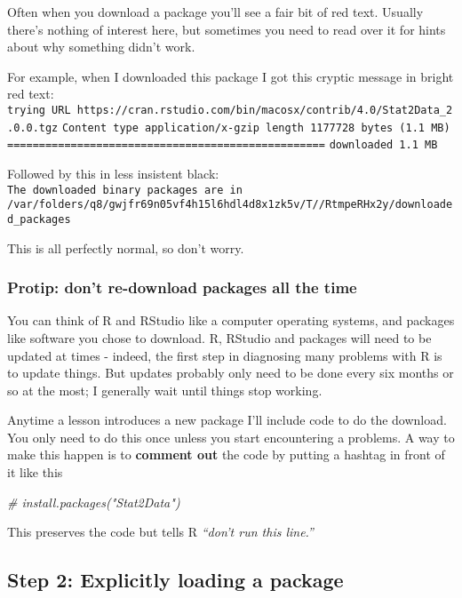 \documentclass[
]{book}
\newenvironment{Shaded}{\begin{snugshade}}{\end{snugshade}}
\newcommand{\CommentTok}[1]{\textcolor[rgb]{0.56,0.35,0.01}{\textit{#1}}}
\begin{document}
Often when you download a package you'll see a fair bit of red text. Usually there's nothing of interest here, but sometimes you need to read over it for hints about why something didn't work.

For example, when I downloaded this package I got this cryptic message in bright red text:
\texttt{trying\ URL\ \textquotesingle{}https://cran.rstudio.com/bin/macosx/contrib/4.0/Stat2Data\_2.0.0.tgz\textquotesingle{}}
\texttt{Content\ type\ \textquotesingle{}application/x-gzip\textquotesingle{}\ length\ 1177728\ bytes\ (1.1\ MB)}
\texttt{==================================================}
\texttt{downloaded\ 1.1\ MB}

Followed by this in less insistent black:
\texttt{The\ downloaded\ binary\ packages\ are\ in}
\texttt{/var/folders/q8/gwjfr69n05vf4h15l6hdl4d8x1zk5v/T//RtmpeRHx2y/downloaded\_packages}

This is all perfectly normal, so don't worry.

\hypertarget{protip-dont-re-download-packages-all-the-time}{%
\subsubsection{Protip: don't re-download packages all the time}\label{protip-dont-re-download-packages-all-the-time}}

You can think of R and RStudio like a computer operating systems, and packages like software you chose to download. R, RStudio and packages will need to be updated at times - indeed, the first step in diagnosing many problems with R is to update things. But updates probably only need to be done every six months or so at the most; I generally wait until things stop working.

Anytime a lesson introduces a new package I'll include code to do the download. You only need to do this once unless you start encountering a problems. A way to make this happen is to \textbf{comment out} the code by putting a hashtag in front of it like this

\begin{Shaded}
\begin{Highlighting}[]
\CommentTok{\# install.packages("Stat2Data")}
\end{Highlighting}
\end{Shaded}

This preserves the code but tells R \emph{``don't run this line.''}

\hypertarget{step-2-explicitly-loading-a-package}{%
\subsection{Step 2: Explicitly loading a package}\label{step-2-explicitly-loading-a-package}}
\end{document}
